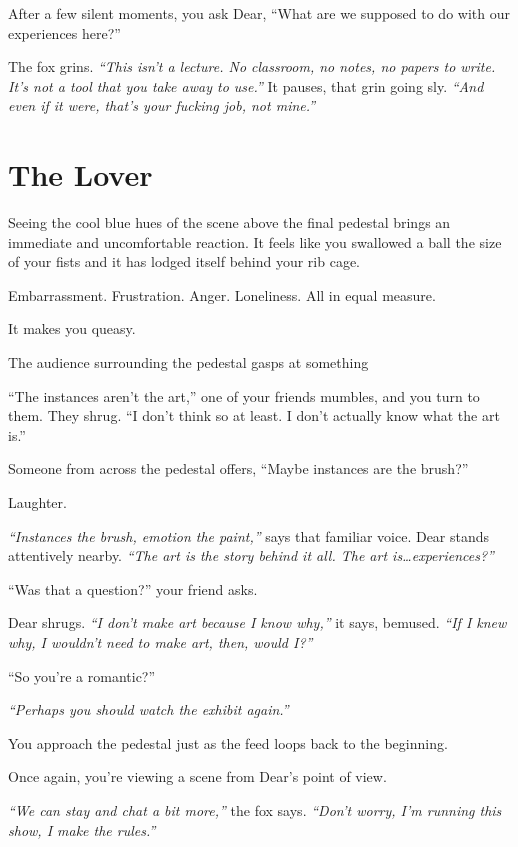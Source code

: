 After a few silent moments, you ask Dear, ``What are we supposed to do with our experiences here?''

The fox grins. \emph{``This isn't a lecture. No classroom, no notes, no papers to write. It's not a tool that you take away to use.''} It pauses, that grin going sly. \emph{``And even if it were, that's your fucking job, not mine.''}

\newpage

\section*{The Lover}

Seeing the cool blue hues of the scene above the final pedestal brings an immediate and uncomfortable reaction. It feels like you swallowed a ball the size of your fists and it has lodged itself behind your rib cage.

Embarrassment. Frustration. Anger. Loneliness. All in equal measure.

It makes you queasy.

The audience surrounding the pedestal gasps at something

``The instances aren't the art,'' one of your friends mumbles, and you turn to them. They shrug. ``I don't think so at least. I don't actually know what the art is.''

Someone from across the pedestal offers, ``Maybe instances are the brush?''

Laughter.

\emph{``Instances the brush, emotion the paint,''} says that familiar voice. Dear stands attentively nearby. \emph{``The art is the story behind it all. The art is\ldots{}experiences?''}

``Was that a question?'' your friend asks.

Dear shrugs. \emph{``I don't make art because I know why,''} it says, bemused. \emph{``If I knew why, I wouldn't need to make art, then, would I?''}

``So you're a romantic?''

\emph{``Perhaps you should watch the exhibit again.''}

You approach the pedestal just as the feed loops back to the beginning.

Once again, you're viewing a scene from Dear's point of view.

\emph{``We can stay and chat a bit more,''} the fox says. \emph{``Don't worry, I'm running this show, I make the rules.''}

